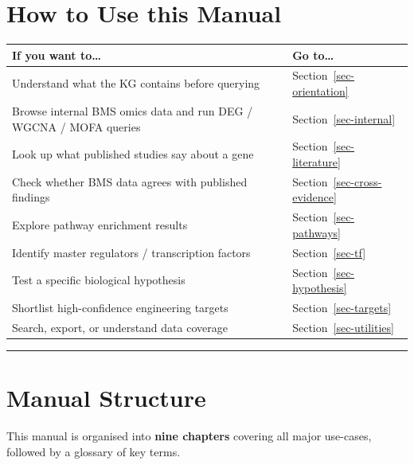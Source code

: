 \documentclass[
  letterpaper,
  oneside,
  open=any]{scrbook}
\newcounter{none} %
\begin{document}
\section{How to Use this Manual}\label{how-to-use-this-manual}

{\def\LTcaptype{none} %
\begin{longtable}[]{@{}
  >{\raggedright\arraybackslash}p{}
  >{\raggedright\arraybackslash}p{}@{}}
\toprule\noalign{}
\begin{minipage}[b]{\linewidth}\raggedright
If you want to\ldots{}
\end{minipage} & \begin{minipage}[b]{\linewidth}\raggedright
Go to\ldots{}
\end{minipage} \\
\midrule\noalign{}
\endhead
\bottomrule\noalign{}
\endlastfoot
Understand what the KG contains before querying &
Section~\ref{sec-orientation} \\
Browse internal BMS omics data and run DEG / WGCNA / MOFA queries &
Section~\ref{sec-internal} \\
Look up what published studies say about a gene &
Section~\ref{sec-literature} \\
Check whether BMS data agrees with published findings &
Section~\ref{sec-cross-evidence} \\
Explore pathway enrichment results & Section~\ref{sec-pathways} \\
Identify master regulators / transcription factors &
Section~\ref{sec-tf} \\
Test a specific biological hypothesis & Section~\ref{sec-hypothesis} \\
Shortlist high-confidence engineering targets &
Section~\ref{sec-targets} \\
Search, export, or understand data coverage &
Section~\ref{sec-utilities} \\
\end{longtable}
}

\begin{center}\rule{0.5\linewidth}{0.5pt}\end{center}

\section{Manual Structure}\label{manual-structure}

This manual is organised into \textbf{nine chapters} covering all major
use-cases, followed by a glossary of key terms.
\end{document}
